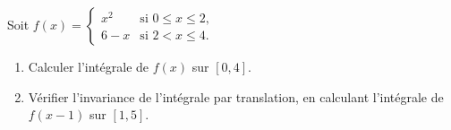 \begin{exercice}
Soit \( f(x) = \begin{cases}
x^2 & \text{si } 0 \leq x \leq 2, \\
6 - x & \text{si } 2 < x \leq 4.
\end{cases} \)
\begin{enumerate}
    \item Calculer l'intégrale de \( f(x) \) sur \( [0, 4] \).
    \item Vérifier l'invariance de l'intégrale par translation, en calculant l'intégrale de \( f(x - 1) \) sur \( [1, 5] \).
\end{enumerate}
\end{exercice}

